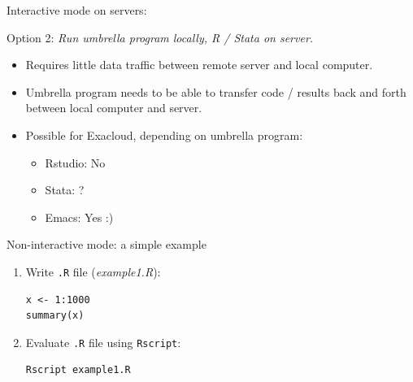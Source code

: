 \documentclass[12pt,t,xcolor=table]{beamer}
\begin{document}
\begin{frame}[label={sec:orgheadline16}]{Interactive mode on servers:}
\begin{block}{Option 2:}
\emph{Run umbrella program locally, R / Stata on server.}

\begin{itemize}
\item Requires little data traffic between remote server and local computer.\setlength\itemsep{0.5em}

\item Umbrella program needs to be able to transfer code / results back and forth between local computer and server.

\item Possible for Exacloud, depending on umbrella program:

\begin{itemize}
\item Rstudio: No

\item Stata: ?

\item Emacs: Yes :)
\end{itemize}
\end{itemize}
\end{block}
\end{frame}

\begin{frame}[fragile,label={sec:orgheadline17}]{Non-interactive mode: a simple example}
 \vspace{1em}

\begin{enumerate}
\item Write \texttt{.R} file (\emph{example1.R}): \setlength\itemsep{0.5em}

\begin{verbatim}
x <- 1:1000
summary(x)
\end{verbatim}

\item Evaluate \texttt{.R} file using \texttt{Rscript}: 

\begin{verbatim}
Rscript example1.R
\end{verbatim}
\end{enumerate}
\end{frame}
\end{document}
